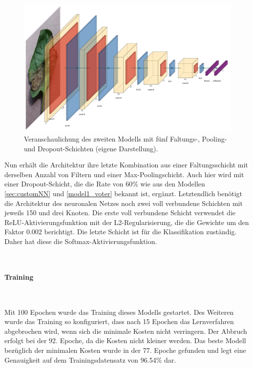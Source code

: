 \begin{figure}[h!]
	\centering
	\includegraphics[width=\textwidth]{bilder/voter2.pdf}
	\caption{Veranschaulichung des zweiten Modells mit fünf Faltungs-, Pooling- und Dropout-Schichten (eigene Darstellung).}
	\label{voter2}
\end{figure}

Nun erhält die Architektur ihre letzte Kombination aus einer Faltungsschicht mit derselben Anzahl von Filtern und einer Max-Poolingschicht. Auch hier wird mit einer Dropout-Schicht, die die Rate von 60\% wie aus den Modellen \ref{sec:customNN} und \ref{model1_voter} bekannt ist, ergänzt. Letztendlich benötigt die Architektur des neuronalen Netzes noch zwei voll verbundene Schichten mit jeweils 150 und drei Knoten. Die erste voll verbundene Schicht verwendet die ReLU-Aktivierungsfunktion mit der L2-Regularisierung, die die Gewichte um den Faktor 0.002 berichtigt. Die letzte Schicht ist für die Klassifikation zuständig. Daher hat diese die Softmax-Aktivierungsfunktion.


~\newline
\paragraph{Training}
~\newline



Mit 100 Epochen wurde das Training dieses Modells gestartet. Des Weiteren wurde das Training so konfiguriert, dass nach 15 Epochen das Lernverfahren abgebrochen wird, wenn sich die minimale Kosten nicht verringern. Der Abbruch erfolgt bei der 92. Epoche, da die Kosten nicht kleiner werden. Das beste Modell bezüglich der minimalen Kosten wurde in der 77. Epoche gefunden und legt eine Genauigkeit auf dem Trainingsdatensatz von 96.54\% dar. 


